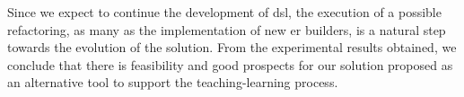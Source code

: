 Since we expect to continue the development of \ac{dsl}, the execution of a possible refactoring, as many as the implementation of new \ac{er} builders, is a natural step towards the evolution of the solution.
From the experimental results obtained, we conclude that there is feasibility and good prospects for our solution proposed as an alternative tool to support the teaching-learning process.





